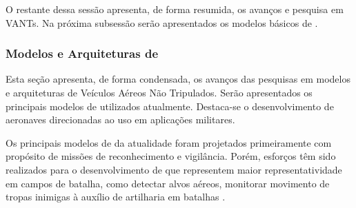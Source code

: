 O restante dessa sessão apresenta, de forma resumida, os avanços e pesquisa em VANTs. Na próxima subsessão serão apresentados os modelos básicos de \vants.

\subsubsection{Modelos e Arquiteturas de \vants}

Esta seção apresenta, de forma condensada, os avanços das pesquisas em modelos e arquiteturas de Veículos Aéreos Não Tripulados. Serão apresentados os principais modelos de \vants utilizados atualmente. Destaca-se o desenvolvimento de aeronaves direcionadas ao uso em aplicações militares.

Os principais modelos de \vants da atualidade foram projetados primeiramente com propósito de missões de reconhecimento e vigilância. Porém, esforços têm sido realizados para o desenvolvimento de \vants que representem maior representatividade em campos de batalha, como detectar alvos aéreos, monitorar movimento de tropas inimigas à auxílio de artilharia em batalhas \cite{Bone2003}.

